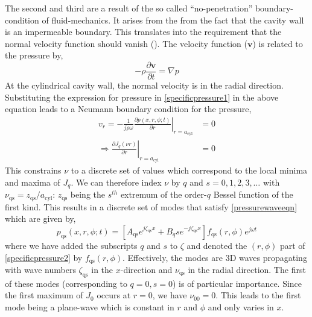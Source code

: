The second and third are a result of the so called ``no-penetration'' boundary-condition
of fluid-mechanics. It arises from the from the fact that the cavity wall is an impermeable boundary. This translates 
into the requirement that the normal velocity function should vanish (\cite[p.~111]{pozrikidisFluid}).
The velocity function ($\mathbf{v}$) is related to the pressure by, 
\begin{equation}\label{pressurevelocityrelation}
 -\rho\frac{\partial \mathbf{v}}{\partial t}=\nabla p
\end{equation}
At the cylindrical cavity wall, the normal velocity is in the radial direction.
Substituting the expression for pressure in \eqref{specificpressure1} in the above equation leads to
a Neumann boundary condition for the pressure,
\begin{align}\label{radialnopenetration}
 v_r=-\left.\frac{1}{j\rho\omega}\frac{\partial p(x,r,\phi;t)}{\partial r}\right\vert_{r=a_{\mathrm{cyl}}}&=0\nonumber\\
    \Rightarrow\left.\frac{\partial J_q (\nu r)}{\partial r}\right\vert_{r=a_{\mathrm{cyl}}}&=0
\end{align}
This constrains $\nu$ to a discrete set of values which correspond to the local minima and maxima
of $J_q$. We can therefore index $\nu$ by $q$ and $s=0,1,2,3,\ldots$ with $\nu_{\mathrm{qs}}=z_{\mathrm{qs}}/a_{\mathrm{cyl}}$:
$z_{\mathrm{qs}}$ being the $s^{th}$ extremum of the order-$q$ Bessel function of the first kind.
This results in a discrete set of modes that satisfy \eqref{pressurewaveeqn} which are given
by,
\begin{equation}\label{specificpressure3}
 p_{\mathrm{qs}}(x,r,\phi;t)=\left[A_{\mathrm{qs}}e^{j\zeta_{\mathrm{qs}}x}+B_q{s}e^{-j\zeta_{\mathrm{qs}}x}\right]f_{\mathrm{qs}}(r,\phi)e^{j\omega t}
\end{equation}
where we have added the subscripts $q$ and $s$ to $\zeta$ and denoted the $(r,\phi)$ part of \eqref{specificpressure2}
by $f_{\mathrm{qs}}(r,\phi)$. Effectively, the
modes are 3D waves propagating with wave numbers $\zeta_{\mathrm{qs}}$ in the $x$-direction and $\nu_{\mathrm{qs}}$ in the radial
direction. The first of these modes (corresponding to $q=0,s=0$) is of particular importance. Since the first
maximum of $J_0$ occurs at $r=0$, we have $\nu_{00}=0$. This leads to the first mode being a plane-wave which
is constant in $r$ and $\phi$ and only varies in $x$. 

